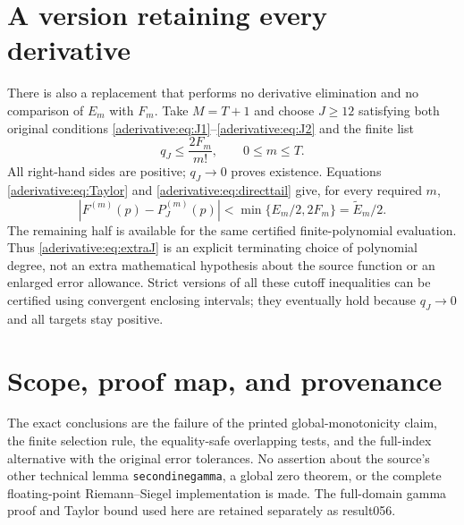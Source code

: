 \documentclass[11pt]{article}
\begin{document}
\section{A version retaining every derivative}\label{aderivative:sec:all}
There is also a replacement that performs no derivative
elimination and no comparison of $E_m$ with $F_m$.
Take $M=T+1$ and choose $J\ge12$ satisfying both original
conditions \eqref{aderivative:eq:J1}--\eqref{aderivative:eq:J2} and the finite list
\begin{equation}\label{aderivative:eq:extraJ}
q_J\le\frac{2F_m}{m!},\qquad 0\le m\le T.
\end{equation}
All right-hand sides are positive; $q_J\to0$ proves
existence. Equations \eqref{aderivative:eq:Taylor} and
\eqref{aderivative:eq:directtail} give, for every required $m$,
\begin{equation}\label{aderivative:eq:halfall}
|F^{(m)}(p)-P_J^{(m)}(p)|
<\min\{E_m/2,2F_m\}=\widetilde E_m/2.
\end{equation}
The remaining half is available for the same certified
finite-polynomial evaluation. Thus \eqref{aderivative:eq:extraJ}
is an explicit terminating choice of polynomial degree,
not an extra mathematical hypothesis about the source
function or an enlarged error allowance. Strict versions
of all these cutoff inequalities can be certified using
convergent enclosing intervals; they eventually hold
because $q_J\to0$ and all targets stay positive.

\section{Scope, proof map, and provenance}\label{aderivative:sec:scope}
The exact conclusions are the failure of the printed
global-monotonicity claim, the finite selection rule,
the equality-safe overlapping tests, and the full-index
alternative with the original error tolerances. No assertion
about the source's other technical lemma
\texttt{secondinegamma}, a global zero theorem, or the
complete floating-point Riemann--Siegel implementation is
made. The full-domain gamma proof and Taylor bound used
here are retained separately as result056.
\end{document}
